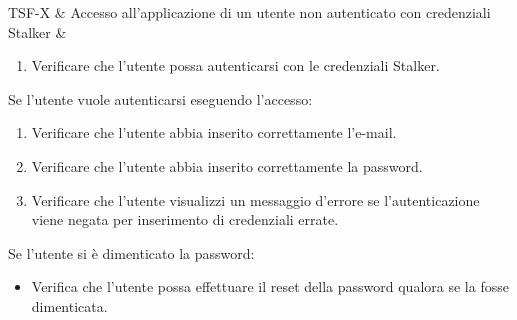 

TSF-X & Accesso all'applicazione di un utente non autenticato con credenziali Stalker & \begin{enumerate}
    \item Verificare che l'utente possa autenticarsi con le credenziali Stalker.
\end{enumerate}
Se l'utente vuole autenticarsi eseguendo l'accesso:
\begin{enumerate}
    \item Verificare che l'utente abbia inserito correttamente l'e-mail.
    \item Verificare che l'utente abbia inserito correttamente la password.
    \item Verificare che l'utente visualizzi un messaggio d'errore se l'autenticazione viene negata per inserimento di credenziali errate.
\end{enumerate}
Se l'utente si è dimenticato la password:
\begin{itemize}
    \item Verifica che l'utente possa effettuare il reset della password qualora se la fosse dimenticata.
\end{itemize} \\

